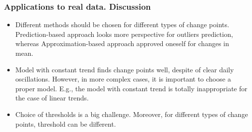 \documentclass[intlimits, 9pt, unicode]{beamer}
\begin{document}
\begin{frame}
    \frametitle{Applications to real data. Discussion}


\begin{itemize}
	\item Different methods should be chosen for different types of change points. Prediction-based approach looks more perspective for outliers prediction, whereas Approximation-based approach approved oneself for changes in mean.
\bigskip
	\item Model with constant trend finds change points well, despite of clear daily oscillations. However, in more complex cases, it is important to choose a proper model. E.g., the model with constant trend is totally inappropriate for the case of linear trends.
\bigskip
	\item Choice of thresholds is a big challenge. Moreover, for different types of change points,
threshold can be different.
\end{itemize}

\end{frame}







	
\end{document}
